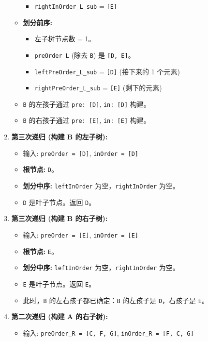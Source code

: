 \begin{enumerate}
\begin{itemize}
\begin{itemize}
			\item \lstinline{rightInOrder_L_sub} = \lstinline{[E]}
		\end{itemize}
		\item \textbf{划分前序:}
		\begin{itemize}
			\item 左子树节点数 = 1。
			\item \lstinline{preOrder_L} (除去 \lstinline{B}) 是 \lstinline{[D, E]}。
			\item \lstinline{leftPreOrder_L_sub} = \lstinline{[D]} (接下来的 1 个元素)
			\item \lstinline{rightPreOrder_L_sub} = \lstinline{[E]} (剩下的元素)
		\end{itemize}
		\item \lstinline{B} 的左孩子通过 \lstinline{pre: [D]}, \lstinline{in: [D]} 构建。
		\item \lstinline{B} 的右孩子通过 \lstinline{pre: [E]}, \lstinline{in: [E]} 构建。
	\end{itemize}
	\item \textbf{第三次递归 (构建 B 的左子树):}
	\begin{itemize}
		\item 输入: \lstinline{preOrder = [D]}, \lstinline{inOrder = [D]}
		\item \textbf{根节点:} \lstinline{D}。
		\item \textbf{划分中序:} \lstinline{leftInOrder} 为空，\lstinline{rightInOrder} 为空。
		\item \lstinline{D} 是叶子节点。返回 \lstinline{D}。
	\end{itemize}
	\item \textbf{第三次递归 (构建 B 的右子树):}
	\begin{itemize}
		\item 输入: \lstinline{preOrder = [E]}, \lstinline{inOrder = [E]}
		\item \textbf{根节点:} \lstinline{E}。
		\item \textbf{划分中序:} \lstinline{leftInOrder} 为空，\lstinline{rightInOrder} 为空。
		\item \lstinline{E} 是叶子节点。返回 \lstinline{E}。
		\item 此时，\lstinline{B} 的左右孩子都已确定：\lstinline{B} 的左孩子是 \lstinline{D}，右孩子是 \lstinline{E}。
	\end{itemize}
	\item \textbf{第二次递归 (构建 A 的右子树):}
	\begin{itemize}
		\item 输入: \lstinline{preOrder_R = [C, F, G]}, \lstinline{inOrder_R = [F, C, G]}

\end{itemize}
\end{enumerate}

